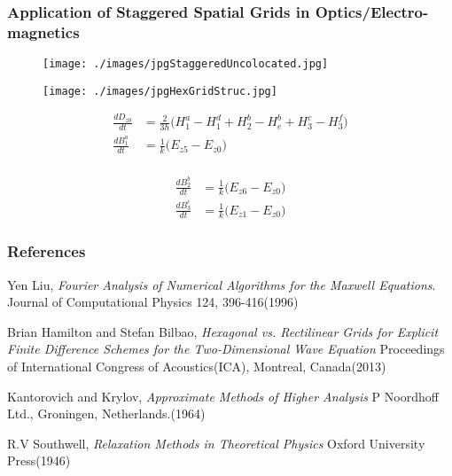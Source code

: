 \documentclass{beamer}
\begin{document}
\begin{frame}
\frametitle{Application of Staggered Spatial Grids in Optics/Electro-magnetics}
\tiny
\begin{figure}
\centering
\begin{minipage}{.5\textwidth}
  \centering
\texttt{[image: ./images/jpgStaggeredUncolocated.jpg]}
\label{fig:StaggeredColocated}
\end{minipage}%
\begin{minipage}{.5\textwidth}
  \centering
\texttt{[image: ./images/jpgHexGridStruc.jpg]}
\end{minipage}
\end{figure}

\begin{minipage}{.5\textwidth}
  \centering
\begin{align*}
\frac{d D_{z0}}{dt} &= \frac{2}{3h} \big( H^a_1 - H^d_1 + H^b_2 - H^b_e + H^c_3 - H^f_3 \big)\\
\frac{d B^a_1}{dt} &= \frac{1}{k} \big(E_{z5} - E_{z0} \big)\\
\end{align*}
\end{minipage}%
\begin{minipage}{.5\textwidth}
  \centering
\begin{align*}
\frac{d B^b_2}{dt}&= \frac{1}{k}\big( E_{z6} - E_{z0}\big)\\
\frac{d B^c_3}{dt}&= \frac{1}{k}\big( E_{z1} - E_{z0} \big)
\end{align*}
\end{minipage}

\end{frame}

\begin{frame}
\frametitle{References}
\begin{thebibliography}{9}

Yen Liu,
  \emph{Fourier Analysis of Numerical Algorithms for the Maxwell Equations}.
Journal of Computational Physics 124, 396-416(1996)

Brian Hamilton and Stefan Bilbao,
\emph{Hexagonal vs. Rectilinear Grids for Explicit Finite Difference Schemes for the Two-Dimensional Wave Equation}
Proceedings of International Congress of Acoustics(ICA), Montreal, Canada(2013)

Kantorovich and Krylov,
\emph{Approximate Methods of Higher Analysis} P Noordhoff Ltd., Groningen, Netherlands.(1964)

R.V Southwell, \emph{Relaxation Methods in Theoretical Physics} Oxford University Press(1946)

\end{thebibliography}
\end{frame}
\end{document}
